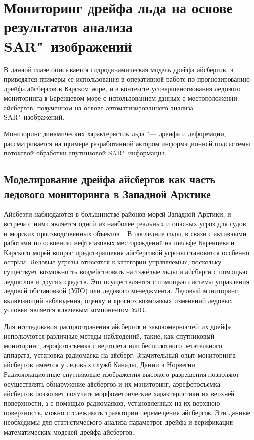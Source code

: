 \chapter{Мониторинг дрейфа льда на основе результатов анализа SAR"~изображений} \label{chapt4}

В данной главе описывается гидродинамическая модель дрейфа айсбергов, и приводятся примеры ее использования в оперативной работе по прогнозированию дрейфа айсбергов в Карском море, и в контексте усовершенствования ледового мониторинга в Баренцевом море с использованием данных о местоположении айсбергов, полученном на основе автоматизированного анализа SAR"~изображений.

Мониторинг динамических характеристик льда "--- дрейфа и деформации, рассматривается на примере разработанной автором информационной подсистемы потоковой обработки спутниковой SAR"~информации.

\section{Моделирование дрейфа айсбергов как часть ледового мониторинга в Западной Арктике} \label{sect4_1}

Айсберги наблюдаются в большинстве районов морей Западной Арктики, и встреча с ними является одной из наиболее реальных и опасных угроз для судов и морских производственных объектов~\cite{Mironov_Smirnov_Iceberg_2015}. В последние годы, в связи с активными работами по освоению нефтегазовых месторождений на шельфе Баренцева и Карского морей вопрос предотвращения айсберговой угрозы становится особенно острым. Ледовые угрозы относятся к категории управляемых, поскольку существует возможность воздействовать на тяжёлые льды и айсберги с помощью ледоколов и других средств. Это осуществляется с помощью системы управления ледовой обстановкой (УЛО) или ледового менеджмента. Ледовый мониторинг, включающий наблюдения, оценку и прогноз возможных изменений ледовых условий является ключевым компонентом УЛО.

Для исследования распространения айсбергов и закономерностей их дрейфа 
используются различные методы наблюдений, такие, как спутниковый мониторинг, 
аэрофотосъемка с вертолета или беспилотного летательного аппарата, установка 
радиомаяка на айсберг. Значительный опыт мониторинга айсбергов имеется у ледовых служб Канады, Дании и Норвегии. Радиолокационные спутниковые изображения высокого разрешения позволяют осуществлять обнаружение айсбергов и их мониторинг, аэрофотосъемка айсбергов позволяет получать морфометрические характеристики их верхней поверхности, а с помощью радиомаяков, установленных на их верхнюю поверхность, можно отслеживать траектории перемещения айсбергов. Эти данные необходимы для статистического анализа параметров дрейфа и верификации математических моделей дрейфа айсбергов.

